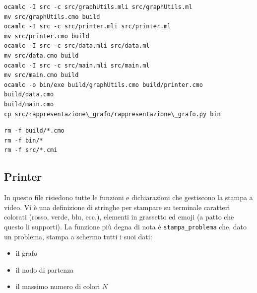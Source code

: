 \documentclass[11pt]{article}
\makeatletter
\providecommand{\tightlist}{%
      \setlength{\itemsep}{0pt}\setlength{\parskip}{0pt}}
\newcommand{\boxspacing}{\kern\kvtcb@left@rule\kern\kvtcb@boxsep}
\newcommand{\prompt}[4]{
        {\ttfamily\llap{{\color{#2}[#3]:\hspace{3pt}#4}}\vspace{-\baselineskip}}
    }
\makeatother
\begin{document}
  \begin{tcolorbox}[breakable, size=fbox, boxrule=.5pt, pad at break*=1mm, opacityfill=0]
\prompt{Out}{outcolor}{29}{\boxspacing}
    \begin{Verbatim}[commandchars=\\\{\}]
ocamlc -I src -c src/graphUtils.mli src/graphUtils.ml
mv src/graphUtils.cmo build
ocamlc -I src -c src/printer.mli src/printer.ml
mv src/printer.cmo build
ocamlc -I src -c src/data.mli src/data.ml
mv src/data.cmo build
ocamlc -I src -c src/main.mli src/main.ml
mv src/main.cmo build
ocamlc -o bin/exe build/graphUtils.cmo build/printer.cmo build/data.cmo
build/main.cmo
cp src/rappresentazione\_grafo/rappresentazione\_grafo.py bin

    \end{Verbatim}
\end{tcolorbox}
        
     \begin{tcolorbox}[breakable, size=fbox, boxrule=.5pt, pad at break*=1mm, opacityfill=0]
\prompt{Out}{outcolor}{29}{\boxspacing}
    \begin{Verbatim}[commandchars=\\\{\}]
rm -f build/*.cmo
rm -f bin/*
rm -f src/*.cmi
    \end{Verbatim}
\end{tcolorbox}

        
    \hypertarget{printer}{%
\subsection{\texorpdfstring{Printer }{Printer }}\label{printer}}

    In questo file risiedono tutte le funzioni e dichiarazioni che
gestiscono la stampa a video. Vi è una definizione di stringhe per
stampare su terminale caratteri colorati (rosso, verde, blu, ecc.),
elementi in grassetto ed emoji (a patto che questo li supporti). La
funzione più degna di nota è \texttt{stampa\_problema} che, dato un
problema, stampa a schermo tutti i suoi dati:

\begin{itemize}
\tightlist
\item
  il grafo
\item
  il nodo di partenza
\item
  il massimo numero di colori \(N\)
\end{itemize}
\end{document}
